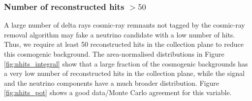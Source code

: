 \subsubsection*{Number of reconstructed hits $> 50$} 
A large number of delta rays cosmic-ray remnants not tagged by the cosmic-ray removal algorithm may fake a neutrino candidate with a low number of hits. Thus, we require at least 50 reconstructed hits in the collection plane to reduce this cosmogenic background. 
The area-normalised distributions in Figure \ref{fig:nhits_integral} show that a large fraction of the cosmogenic backgrounds has a very low number of reconstructed hits in the collection plane, while the signal and the neutrino components have a much broader distribution. Figure \ref{fig:nhits_pot} shows a good data/Monte Carlo agreement for this variable.

